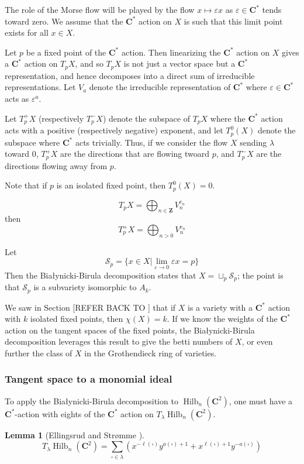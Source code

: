 \documentclass{amsart}[12pt]
\theoremstyle{definition}
\newtheorem{lemma}[dummy]{Lemma}
\newcommand{\Z}{\mathbf{Z}}
\newcommand{\C}{\mathbf{C}}
\DeclareMathOperator{\Hilb}{Hilb}
\begin{document}
The role of the Morse flow will be played by the flow $x\mapsto \varepsilon x$ as $\varepsilon\in\C^*$ tends toward zero.  We assume that the $\C^*$ action on $X$ is such that this limit point exists for all $x\in X$.  

Let $p$ be a fixed point of the $\C^*$ action.  Then linearizing the $\C^*$ action on $X$ gives a $\C^*$ action on $T_pX$, and so $T_pX$ is not just a vector space but a $\C^*$ representation, and hence decomposes into a direct sum of irreducible representations.  Let $V_a$ denote the irreducible representation of $\C^*$ where $\varepsilon\in\C^*$ acts as $\varepsilon^a$.  


Let $T_p^+X$ (respectively $T_p^-X$) denote the subspace of $T_pX$ where the $\C^*$ action acts with a positive (respectively negative) exponent, and let $T_p^0(X)$ denote the subspace where $\C^*$ acts trivially.  Thus, if we consider the flow $X$ sending $\lambda$ toward 0, $T_p^+X$ are the directions that are flowing twoard $p$, and $T_p^-X$ are the directions flowing away from $p$.  

Note that if $p$ is an isolated fixed point, then $T_p^0(X)=0$.

$$T_pX=\bigoplus_{n\in\Z} V_n^{e_n}$$
then
$$T_p^+X=\bigoplus_{n>0} V_n^{e_n}$$

Let 
$$\mathcal{S}_p=\{x\in X|\lim_{\varepsilon\to 0} \varepsilon x=p\}$$
Then the Bia\l ynicki-Birula decomposition states that $X=\sqcup_{p}\mathcal{S}_p$; the point is that $\mathcal{S}_p$ is a subvariety isomorphic to $A_k$.





We saw in Section [REFER BACK TO ] that if $X$ is a variety with a $\C^*$ action with $k$ isolated fixed points, then $\chi(X)=k$.  If we know the weights of the $\C^*$ action on the tangent spaces of the fixed points, the Bia\l ynicki-Birula decomposition leverages this result to give the betti numbers of $X$, or even further the class of $X$ in the Grothendieck ring of varieties.

\subsubsection{Tangent space to a monomial ideal}
To apply the Bia\l ynicki-Birula decomposition to $\Hilb_n(\C^2)$, one must have a $\C^*$-action with eights of the $\C^*$ action on $T_\lambda\Hilb_n(\C^2)$.

\begin{lemma}[Ellingsrud and Str\o mme \cite{ES}] \label{lem:torus-weights}
$$T_\lambda \Hilb_n(\C^2)=\sum_{\square\in\lambda} \left(x^{-\ell(\square)} y^{a(\square)+1}+x^{\ell(\square)+1}y^{-a(\square)}\right)$$
\end{lemma}
\end{document}
